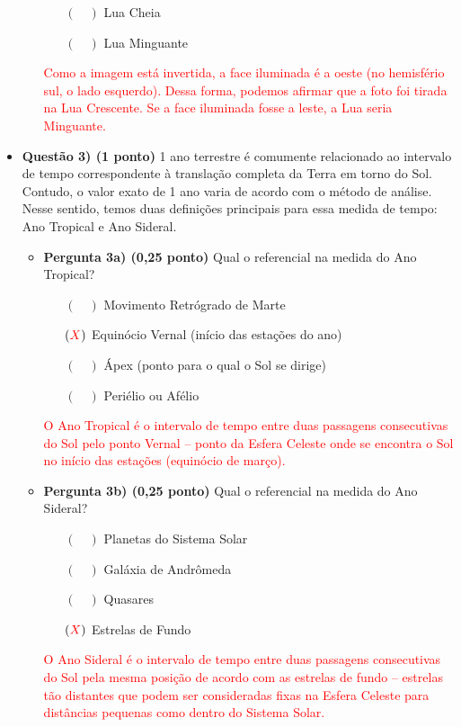 \documentclass[a4paper, 12pt]{article}
\begin{document}
\begin{flushleft}
\begin{itemize}
\begin{itemize}
\begin{itemize}
						\item[$(\quad)$] Lua Cheia
						\item[$(\quad)$] Lua Minguante
					\end{itemize}
					\textcolor{red}{Como a imagem está invertida, a face iluminada é a oeste (no hemisfério sul, o lado esquerdo). Dessa forma, podemos afirmar que a foto foi tirada na Lua Crescente. Se a face iluminada fosse a leste, a Lua seria Minguante.}
			\end{itemize}
		\item \textbf{Questão 3) (1 ponto)} 1 ano terrestre é comumente relacionado ao intervalo de tempo correspondente à translação completa da Terra em torno do Sol. Contudo, o valor exato de 1 ano varia de acordo com o método de análise. Nesse sentido, temos duas definições principais para essa medida de tempo: Ano Tropical e Ano Sideral.
			\begin{itemize}
				\item \textbf{Pergunta 3a) (0,25 ponto)} Qual o referencial na medida do Ano Tropical?
					\begin{itemize}
						\item[$(\quad)$] Movimento Retrógrado de Marte
						\item[$(\textcolor{red}{X})$] Equinócio Vernal (início das estações do ano)
						\item[$(\quad)$] Ápex (ponto para o qual o Sol se dirige)
						\item[$(\quad)$] Periélio ou Afélio
					\end{itemize}
					\textcolor{red}{O Ano Tropical é o intervalo de tempo entre duas passagens consecutivas do Sol pelo ponto Vernal -- ponto da Esfera Celeste onde se encontra o Sol no início das estações (equinócio de março).}
				\item \textbf{Pergunta 3b) (0,25 ponto)} Qual o referencial na medida do Ano Sideral?
					\begin{itemize}
						\item[$(\quad)$] Planetas do Sistema Solar
						\item[$(\quad)$] Galáxia de Andrômeda
						\item[$(\quad)$] Quasares
						\item[$(\textcolor{red}{X})$] Estrelas de Fundo
					\end{itemize}
					\textcolor{red}{O Ano Sideral é o intervalo de tempo entre duas passagens consecutivas do Sol pela mesma posição de acordo com as estrelas de fundo -- estrelas tão distantes que podem ser consideradas fixas na Esfera Celeste para distâncias pequenas como dentro do Sistema Solar.}

\end{itemize}
\end{itemize}
\end{flushleft}
\end{document}

